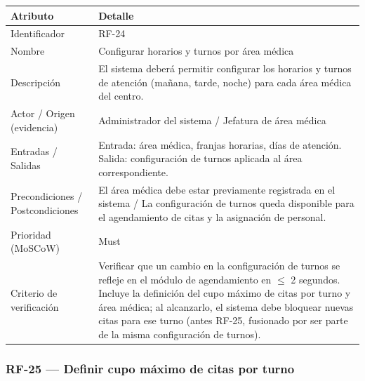 \documentclass[11pt,a4paper]{article}
\begin{document}
	\begin{longtable}{p{} p{}}
		
		\toprule
		\textbf{Atributo} & \textbf{Detalle} \\
		\midrule
		\endhead
		
		Identificador & RF-24 \\
		Nombre & Configurar horarios y turnos por área médica \\
		Descripción & El sistema deberá permitir configurar los horarios y turnos de atención (mañana, tarde, noche) para cada área médica del centro. \\
		Actor / Origen (evidencia) & Administrador del sistema / Jefatura de área médica \\
		Entradas / Salidas & Entrada: área médica, franjas horarias, días de atención. Salida: configuración de turnos aplicada al área correspondiente. \\
		Precondiciones / Postcondiciones & El área médica debe estar previamente registrada en el sistema / La configuración de turnos queda disponible para el agendamiento de citas y la asignación de personal. \\
		Prioridad (MoSCoW) & Must \\
		Criterio de verificación & Verificar que un cambio en la configuración de turnos se refleje en el módulo de agendamiento en \(\leq\) 2 segundos. Incluye la definición del cupo máximo de citas por turno y área médica; al alcanzarlo, el sistema debe bloquear nuevas citas para ese turno (antes RF-25, fusionado por ser parte de la misma configuración de turnos). \\
		\bottomrule
	\end{longtable}
	
	\subsubsection{RF-25 --- Definir cupo máximo de citas por turno}
	
\end{document}
